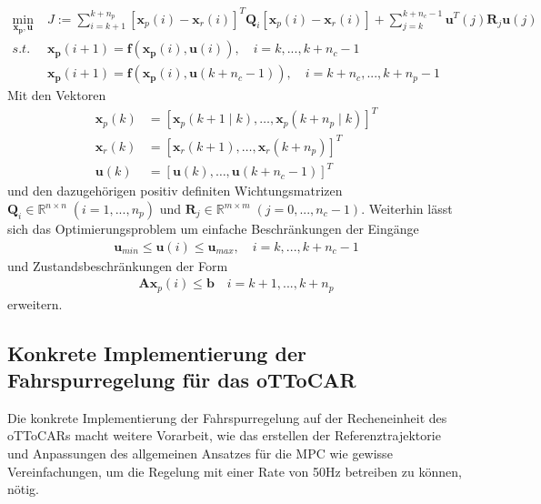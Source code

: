 \begin{align*}
	\underset{\boldsymbol{x_p, u}}{\text{min}}\;&J:=\sum_{i=k+1}^{k+n_p} \left [\boldsymbol{x}_{p}(i)-\boldsymbol{x}_{r}(i)\right ]^T\boldsymbol{Q}_i\left [\boldsymbol{x}_{p}(i)-\boldsymbol{x}_{r}(i)\right ] +\sum_{j=k}^{k+n_c-1} \boldsymbol{u}^T(j)\boldsymbol{R}_j\boldsymbol{u}(j)\\
	s.t.\;&\boldsymbol{x_p}(i+1)=\boldsymbol{f}\left ( \boldsymbol{x_p}(i), \boldsymbol{u}(i) \right ),\quad i=k,...,k+n_c-1\\
	&\boldsymbol{x_p}(i+1)=\boldsymbol{f}\left ( \boldsymbol{x_p}(i), \boldsymbol{u}(k+n_c-1) \right ),\quad i=k+n_c,...,k+n_p-1
\end{align*}
Mit den Vektoren
\begin{align*}
	\boldsymbol{x}_p(k)&=\left [ \boldsymbol{x}_p(k+1\mid k),\dots,\boldsymbol{x}_p(k+n_p\mid k) \right ]^T\\
	\boldsymbol{x}_r(k)&=\left [ \boldsymbol{x}_r(k+1),\dots,\boldsymbol{x}_r(k+n_p) \right ]^T\\
	\boldsymbol{u}(k)&=\left [ \boldsymbol{u}(k),\dots,\boldsymbol{u}(k+n_c-1) \right ]^T
\end{align*}
und den dazugehörigen positiv definiten Wichtungsmatrizen $\boldsymbol{Q}_i\in\mathbb{R}^{n\times n}\;(i=1, ...,n_p)$ und $\boldsymbol{R}_j\in\mathbb{R}^{m\times m}\;(j=0, ...,n_c-1)$. Weiterhin lässt sich das Optimierungsproblem um einfache Beschränkungen der Eingänge
\begin{align*}
  \boldsymbol{u}_{min} \leq \boldsymbol{u}(i) \leq \boldsymbol{u}_{max},\quad i=k,...,k+n_c-1
\end{align*}
und Zustandsbeschränkungen der Form
\begin{align*}
  \boldsymbol{A}\boldsymbol{x}_p(i) \leq \boldsymbol{b}\quad i=k+1,...,k+n_p
\end{align*}
erweitern.

\subsection{Konkrete Implementierung der Fahrspurregelung für das oTToCAR}
Die konkrete Implementierung der Fahrspurregelung auf der Recheneinheit des oTToCARs macht weitere Vorarbeit, wie das erstellen der Referenztrajektorie und Anpassungen des allgemeinen Ansatzes für die MPC wie gewisse Vereinfachungen, um die Regelung mit einer Rate von 50Hz betreiben zu können, nötig.
